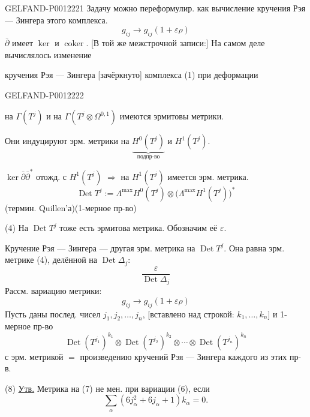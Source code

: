 \begin{GelfandAdjacentEvidence}{GELFAND-P001222}{1}
Задачу можно переформулир. как вычисление кручения Рэя --- Зингера этого комплекса.
\begin{equation*}
g_{ij}\longrightarrow g_{ij}(1+\varepsilon\rho)\tag{2}
\end{equation*}
\(\bar\partial\) имеет \(\ker\) и \(\operatorname{coker}\).
[В той же межстрочной записи:] На самом деле вычислялось изменение

кручения Рэя --- Зингера [зачёркнуто] комплекса (1) при деформации
\end{GelfandAdjacentEvidence}
\begin{GelfandAdjacentEvidence}{GELFAND-P001222}{2}


на \(\Gamma(T^j)\) и на \(\Gamma(T^j\otimes\Omega^{0,1})\)
имеются эрмитовы метрики.

Они индуцируют эрм. метрики на \(\underbrace{H^0(T^j)}_{\text{подпр-во}}\) и \(H^1(T^j)\).

\(\ker\bar\partial\bar\partial^*\) отожд. с \(H^1(T^j)\)
\(\Rightarrow\) на \(H^1(T^j)\) имеется эрм. метрика.
\begin{equation*}
\operatorname{Det}T^j:=\Lambda^{\max}H^0(T^j)
\otimes\bigl(\Lambda^{\max}H^1(T^j)\bigr)^*\tag{3}
\end{equation*}
(термин. Quillen'а)\qquad(1-мерное пр-во)

(4) На \(\operatorname{Det}T^j\) тоже есть эрмитова метрика. Обозначим её \(\varepsilon\).

Кручение Рэя --- Зингера --- другая эрм. метрика на \(\operatorname{Det}T^j\). Она равна эрм. метрике (4), делённой на \(\operatorname{Det}\Delta_j\):
\begin{equation*}
\frac{\varepsilon}{\operatorname{Det}\Delta_j}\tag{5}
\end{equation*}
Рассм. вариацию метрики:
\begin{equation*}
g_{ij}\longrightarrow g_{ij}(1+\varepsilon\rho)\tag{6}
\end{equation*}
Пусть даны послед. чисел \(j_1,j_2,\ldots,j_n\),
[вставлено над строкой: \(k_1,\ldots,k_n\)] и 1-мерное пр-во
\begin{equation*}
\operatorname{Det}(T^{j_1})^{k_1}\otimes
\operatorname{Det}(T^{j_2})^{k_2}\otimes\cdots\otimes
\operatorname{Det}(T^{j_n})^{k_n}\tag{7}
\end{equation*}
с эрм. метрикой \(=\) произведению кручений Рэя --- Зингера каждого из этих пр-в.

(8) \underline{Утв.} Метрика на (7) не мен. при вариации (6), если
\begin{equation*}
\sum_\alpha(6j_\alpha^2+6j_\alpha+1)k_\alpha=0.\tag{9}
\end{equation*}
\end{GelfandAdjacentEvidence}
